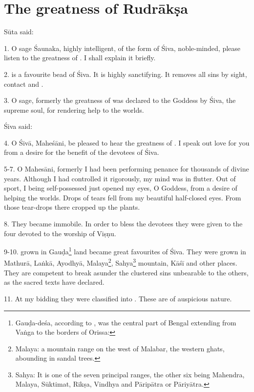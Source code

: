 \chapter{The greatness of Rudrākṣa}

Sūta said:

1. O sage Śaunaka, highly intelligent, of the form of Śiva, noble-minded, please
listen to the greatness of . I shall explain it briefly.

2.  is a favourite bead of Śiva. It is highly sanctifying. It
removes all sins by sight, contact and .

3. O sage, formerly the greatness of  was declared to the Goddess
by Śiva, the supreme soul, for rendering help to the worlds.

Śiva said:

4. O Śivā, Maheśāni, be pleased to hear the greatness of . I speak
out love for you from a desire for the benefit of the devotees of Śiva.

5-7. O Mahesāni, formerly I had been performing penance for thousands of divine
years. Although I had controlled it rigorously, my mind was in flutter. Out of
sport, I being self-possessed just opened my eyes, O Goddess, from a desire of
helping the worlds. Drops of tears fell from my beautiful half-closed eyes. From
those tear-drops there cropped up the  plants.

8. They became immobile. In order to bless the devotees they were given to
the four  devoted to the worship of Viṣṇu.

9-10.  grown in Gauḍa\footnote{Gauḍa-deśa, according to
, was the central part of Bengal extending from Vaṅga to
the borders of Orissa: } land became great favourites of Śiva.
They were grown in Mathurā, Laṅkā, Ayodhyā, Malaya\footnote{Malaya: a mountain
range on the west of Malabar, the western ghats, abounding in sandal trees.},
Sahya\footnote{Sahya: It is one of the seven principal ranges, the other six
being Mahendra, Malaya, Sūktimat, Rikṣa, Vindhya and Pāripātra or Pāriyātra.}
mountain, Kāśī and other places. They are competent to break asunder
the clustered sins unbearable to the others, as the sacred texts have declared.

11. At my bidding they were classified into . These  are of auspicious nature.

